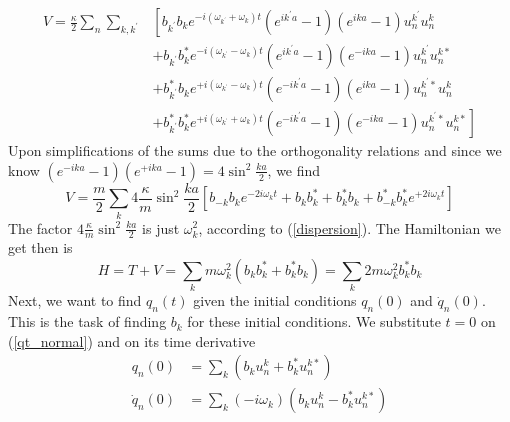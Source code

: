 \begin{equation}\begin{aligned}
V=\frac{\kappa}{2} \sum_{n} \sum_{k, k^{\prime}} &\left[b_{k^{\prime}} b_{k} {e}^{-{i}\left(\omega_{k^{\prime}}+\omega_{k}\right) t}\left({e}^{{i} k^{\prime} a}-1\right)\left({e}^{{i} k a}-1\right) u_{n}^{k^{\prime}} u_{n}^{k}\right.\\
&+b_{k^{\prime}} b_{k}^{*} {e}^{-{i}\left(\omega_{k^{\prime}}-\omega_{k}\right) t}\left({e}^{{i} k^{\prime} a}-1\right)\left({e}^{-{i} k a}-1\right) u_{n}^{k^{\prime}} u_{n}^{k *} \\
&+b_{k^{\prime}}^{*} b_{k} {e}^{+{i}\left(\omega_{k^{\prime}}-\omega_{k}\right) t}\left({e}^{-{i} k^{\prime} a}-1\right)\left({e}^{{i} k a}-1\right) u_{n}^{k^{\prime} *} u_{n}^{k} \\
&\left.+b_{k^{\prime}}^{*} b_{k}^{*} {e}^{+{i}\left(\omega_{k^{\prime}}+\omega_{k}\right) t}\left({e}^{-{i} k^{\prime} a}-1\right)\left({e}^{-{i} k a}-1\right) u_{n}^{k^{\prime} *} u_{n}^{k *}\right]
\end{aligned}\end{equation}
Upon simplifications of the sums due to the orthogonality relations and since we know
$\left(e^{-i k a}-1\right)\left(e^{+i k a}-1\right)=4 \sin ^{2} \frac{k a}{2}$, we find
\begin{equation}
V=\frac{m}{2} \sum_{k} 4 \frac{\kappa}{m} \sin ^{2} \frac{k a}{2}\left[b_{-k} b_{k} {e}^{-2 {i} \omega_{k} t}+b_{k} b_{k}^{*}+b_{k}^{*} b_{k}+b_{-k}^{*} b_{k}^{*} {e}^{+2 {i} \omega_{k} t}\right]
\end{equation}
The factor $4\frac{\kappa}{m} \sin ^{2} \frac{k a}{2}$ is just $\omega_k^2$, according to (\ref{dispersion}). The Hamiltonian we get then is
\begin{equation}
H=T+V=\sum_{k} m \omega_{k}^{2}\left(b_{k} b_{k}^{*}+b_{k}^{*} b_{k}\right)=\sum_{k} 2 m \omega_{k}^{2} b_{k}^{*} b_{k}
\label{hamilt_bk}
\end{equation}
Next, we want to find $q_n(t)$ given the initial conditions $q_n(0)$ and $\dot{q}_n(0)$. This is the task of finding $b_{k}$ for these initial conditions. We substitute $t=0$ on (\ref{qt_normal}) and on its time derivative
\begin{equation}
\begin{aligned}
q_{n}(0) &=\sum_{k}\left(b_{k} u_{n}^{k}+b_{k}^{*} u_{n}^{k *}\right) \\
\dot{q}_{n}(0) &=\sum_{k}\left(-{i} \omega_{k}\right)\left(b_{k} u_{n}^{k}-b_{k}^{*} u_{n}^{k *}\right)
\end{aligned}
\end{equation}
